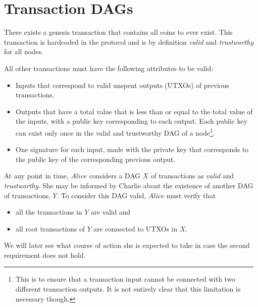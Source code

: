 \section{Transaction DAGs}
  There exists a genesis transaction that contains all coins to ever exist. This
  transaction is hardcoded in the protocol and is by definition \textit{valid} and
  \textit{trustworthy} for all nodes.
  \begin{center}
    \begin{dot2tex}[outputdir=dot2tex/, file=coinbase]
      
    \end{dot2tex}
  \end{center}
  All other transactions must have the following attributes to be valid:
  \begin{itemize}
    \item Inputs that correspond to valid unspent outputs (UTXOs) of previous
    transactions.
    \item Outputs that have a total value that is less than or equal to the total value of
      the inputs, with a public key corresponding to each output. Each public key can
      exist only once in the valid and trustworthy DAG of a node\footnote{This is to
      ensure that a transaction input cannot be connected with two different transaction
      outputs. It is not entirely clear that this limitation is necessary though.}.
    \item One signature for each input, made with the private key that corresponds to the
      public key of the corresponding previous output.
  \end{itemize}
  At any point in time, $Alice$ considers a DAG $X$ of transactions as \textit{valid} and
  \textit{trustworthy}. She may be informed by Charlie about the existence of another DAG
  of transactions, $Y$. To consider this DAG valid, $Alice$ must verify that
  \begin{itemize}
    \item all the transactions in $Y$ are valid and
    \item all root transactions of $Y$ are connected to UTXOs in $X$.
  \end{itemize}
  We will later see what course of action she is expected to take in case the second
  requirement does not hold.

